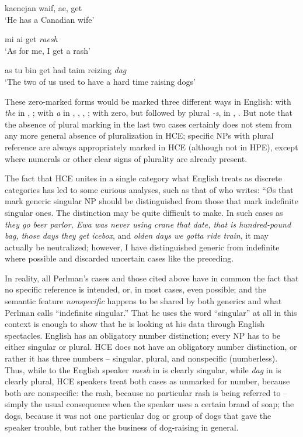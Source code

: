 \ea\label{ex:41}
kaenejan waif, ae, get \\
\glt `He has a Canadian wife'
\glt 
\z

\ea\label{ex:42}
mi ai get \textit{raesh}\\
\glt `As for me, I get a rash'
\z

\ea\label{ex:43}
as tu bin get had taim reizing \textit{dag}\\
\glt `The two of us used to have a hard time raising dogs'
\z

These zero-marked forms would be marked three different ways in English: with \textit{the} in , ; with \textit{a} in , , , ; with zero, but followed by plural \textit{-s}, in , . But note that the absence of plural marking in the last two cases certainly does not stem from any more general absence of pluralization in HCE; specific NPs with plural reference are always appropriately marked in HCE (although not in HPE), except where numerals or other clear signs of plurality are already present.

The fact that HCE unites in a single category what English treats as discrete categories has led to some curious analyses, such as that of \citet[99]{Perlman1973} who writes: ``{\O}s that mark generic singular NP should be distinguished from those that mark indefinite singular ones. The distinction may be quite difficult to make. In such cases as \textit{they go beer parlor, Ewa was never using crane that date, that is hundred-pound bag, those days they get icebox}, and \textit{olden days we gotta ride train}, it may actually be neutralized; however, I have dis\-tinguished generic from indefinite where possible and discarded un\-certain cases like the preceding.{\textquotedbl}

In reality, all Perlman's cases and those cited above have in common the fact that no specific reference is intended, or, in most cases, even possible; and the semantic feature \textit{nonspecific} happens to be
shared by both generics and what Perlman calls ``indefinite singular.'' That he uses the word ``singular'' at all in this context is enough to show that he is looking at his data through English spectacles. English has an obligatory number distinction; every NP has to be either singular or plural. HCE does not have an obligatory number distinction, or rather it has three numbers -- singular, plural, and nonspecific (number\-less). Thus, while to the English speaker \textit{raesh} in  is clearly singular, while \textit{dag} in  is clearly plural, HCE speakers treat both cases as unmarked for number, because both are nonspecific: the rash, because no particular rash is being referred to -- simply the usual consequence when the speaker uses a certain brand of soap; the dogs, because it was not one particular dog or group of dogs that gave the speaker trouble, but rather the business of dog-raising in general.

